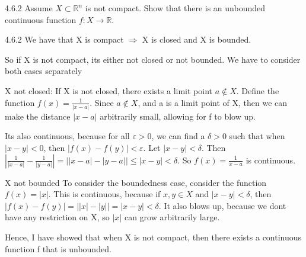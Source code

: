 \documentclass[a4paper,norsk]{article}
\renewcommand{\leq}{\leqslant}
\renewcommand{\epsilon}{\varepsilon}
\begin{document}
\begin{oppgavebox}{4.6.2}{}
Assume $ X \subset \mathbb{R}^n $ is not compact. Show that there is an unbounded continuous function $ f : X \to \mathbb{R} $.

\begin{proofbox}{4.6.2}{}
  We have that X is compact $ \Rightarrow  $  X is closed and X is bounded.
  

  So if X is not compact, its either not closed or not bounded. We have to consider both cases separately



  X not closed:
  If X is not closed, there exists a limit point $ a \notin X $. Define the function $ f(x) = \frac{ 1 }{ \left| x-a \right|  } $. Since $ a \notin X $, and a is a limit point of X, then we can make the distance $ \left| x-a \right|  $ arbitrarily small, allowing for f to blow up. 
  
  
  Its also continuous, because for all $ \epsilon > 0 $, we can find a $ \delta > 0 $  such that when $ \left| x-y \right| < 0  $, then $ \left| f(x) - f(y)\right| < \epsilon   $. Let $ \left| x - y \right| < \delta  $. Then $ \left| \frac{ 1 }{ \left| x-a \right| } - \frac{ 1 }{ \left| y-a \right|  } \right| = \left| \left| x-a \right| - \left| y-a \right|  \right| \leq \left| x-y \right| < \delta   $. So $ f(x) = \frac{ 1 }{ x-a } $ is continuous. 



  X not bounded
  To consider the boundedness case, consider the function $ f(x) = \left| x \right|  $. This is continuous, because if $ x, y \in X $ and $ \left| x-y \right| < \delta  $, then $ \left| f(x) - f(y) \right| = \left| \left| x \right| - \left| y \right|  \right| = \left| x - y \right| < \delta    $. It also blows up, because we dont have any restriction on X, so $ \left| x \right|  $ can grow arbitrarily large.
  


  Hence, I have showed that when X is not compact, then there exists a continuous function f that is unbounded.
\end{proofbox}
\end{oppgavebox}
\end{document}
